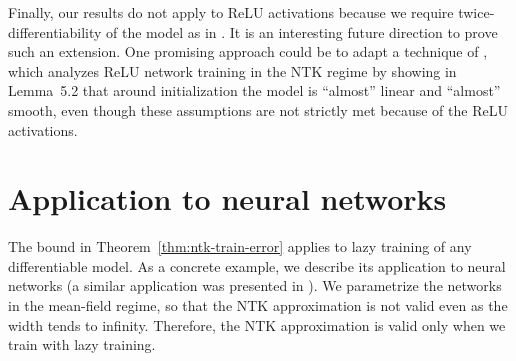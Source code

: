\documentclass[11pt]{article} %
\newcommand{\<}{\langle}
\renewcommand{\>}{\rangle}
\theoremstyle{plain}
\theoremstyle{definition}
\theoremstyle{remark}
\begin{document}
Finally, our results do not apply to ReLU activations because we require twice-differentiability of the model as in \cite{chizat2019lazy}. It is an interesting future direction to prove such an extension. One promising approach could be to adapt a technique of \cite{cao2020generalization}, which analyzes ReLU network training in the NTK regime by showing in Lemma~5.2 that around initialization the model is ``almost'' linear and ``almost'' smooth, even though these assumptions are not strictly met because of the ReLU activations.





















\section{Application to neural networks}\label{sec:network-application}


The bound in Theorem~\ref{thm:ntk-train-error} applies to lazy training of any differentiable model. As a concrete example, we describe its application to neural networks (a similar application was presented in \cite{chizat2019lazy}). We parametrize the networks in the mean-field regime, so that the NTK approximation is not valid even as the width tends to infinity. Therefore, the NTK approximation is valid only when we train with lazy training.
\end{document}
